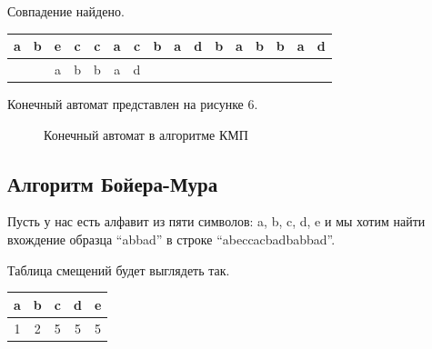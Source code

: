 \documentclass[a4paper,14pt]{report}
\begin{document}
Совпадение найдено.

\begin{table}[h]
		\begin{tabular}{| c | c | c | c | c | c | c | c | c | c | c | c | c | c | c | c |}
	 	\hline
		a & b & e & c & c & a & c & b & a & d & b & a & b & b & a & d \\ \hline
      &   & a & b & b & a & d & & & & & & & & & \\ \hline
		\end{tabular}
\end{table}

Конечный автомат представлен на рисунке 6.

\begin{figure}[h]
\caption{Конечный автомат в алгоритме КМП}
\label{fig:image}
\end{figure}

\subsection*{Алгоритм Бойера-Мура}

Пусть у нас есть алфавит из пяти символов: a, b, c, d, e и мы хотим найти вхождение образца “abbad” в строке “abeccacbadbabbad”.

Таблица смещений будет выглядеть так.

\begin{table}[h]
		\begin{tabular}{| c | c | c | c | c |}
	 	\hline
		a & b & c & d & e \\ \hline
    1 & 2 & 5 & 5 & 5 \\ \hline
		\end{tabular}
\end{table}
\end{document}
